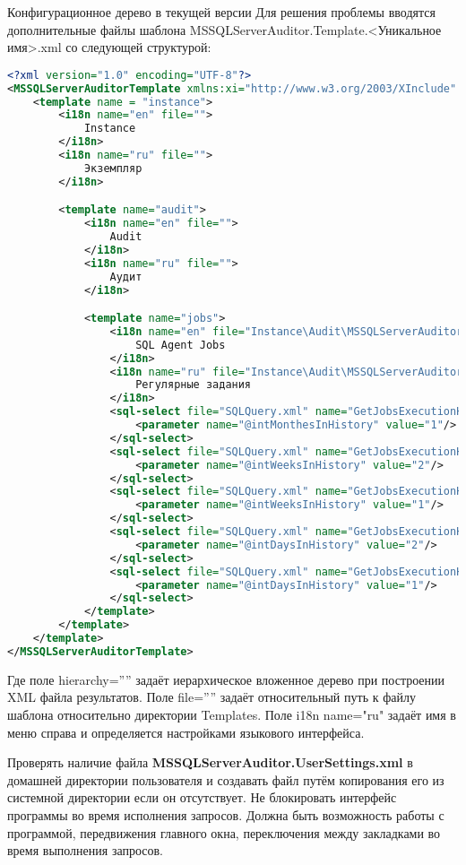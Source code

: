 \documentclass[10pt,a4paper]{article}
\begin{document}
Конфигурационное дерево в текущей версии Для решения проблемы вводятся
дополнительные файлы шаблона MSSQLServerAuditor.Template.<Уникальное имя>.xml со
следующей структурой:

\begin{lstlisting}[language=XML,label=MSSQLServerAuditor.Template.xml,caption=MSSQLServerAuditor.Template.xml]
<?xml version="1.0" encoding="UTF-8"?>
<MSSQLServerAuditorTemplate xmlns:xi="http://www.w3.org/2003/XInclude" version="1.0">
	<template name = "instance">
		<i18n name="en" file="">
			Instance
		</i18n>
		<i18n name="ru" file="">
			Экземпляр
		</i18n>

		<template name="audit">
			<i18n name="en" file="">
				Audit
			</i18n>
			<i18n name="ru" file="">
				Аудит
			</i18n>

			<template name="jobs">
				<i18n name="en" file="Instance\Audit\MSSQLServerAuditor.Jobs.en.xsl">
					SQL Agent Jobs
				</i18n>
				<i18n name="ru" file="Instance\Audit\MSSQLServerAuditor.Jobs.ru.xsl">
					Регулярные задания
				</i18n>
				<sql-select file="SQLQuery.xml" name="GetJobsExecutionHistory" hierarchy="Instance\Audit\Jobs\LastMonth">
					<parameter name="@intMonthesInHistory" value="1"/>
				</sql-select>
				<sql-select file="SQLQuery.xml" name="GetJobsExecutionHistory" hierarchy="Instance\Audit\Jobs\LastTwoWeek">
					<parameter name="@intWeeksInHistory" value="2"/>
				</sql-select>
				<sql-select file="SQLQuery.xml" name="GetJobsExecutionHistory" hierarchy="Instance\Audit\Jobs\LastWeek">
					<parameter name="@intWeeksInHistory" value="1"/>
				</sql-select>
				<sql-select file="SQLQuery.xml" name="GetJobsExecutionHistory" hierarchy="Instance\Audit\Jobs\LastTwoDays">
					<parameter name="@intDaysInHistory" value="2"/>
				</sql-select>
				<sql-select file="SQLQuery.xml" name="GetJobsExecutionHistory" hierarchy="Instance\Audit\Jobs\Today">
					<parameter name="@intDaysInHistory" value="1"/>
				</sql-select>
			</template>
		</template>
	</template>
</MSSQLServerAuditorTemplate>
\end{lstlisting}

Где поле hierarchy=”” задаёт иерархическое вложенное дерево при построении XML
файла результатов. Поле file=”” задаёт относительный путь к файлу шаблона
относительно директории Templates. Поле i18n name="ru" задаёт имя в меню справа
и определяется настройками языкового интерфейса.

Проверять наличие файла \textbf{MSSQLServerAuditor.UserSettings.xml} в домашней
директории пользователя и создавать файл путём копирования его из системной
директории если он отсутствует. Не блокировать интерфейс программы во время
исполнения запросов. Должна быть возможность работы с программой, передвижения
главного окна, переключения между закладками во время выполнения запросов.
\end{document}
